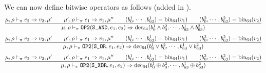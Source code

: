 We can now define bitwise operators as follows (added in \Cpm).\\
\[\dfrac{\mu,\rho\vdash_\pi e_2\Rightarrow v_2,\mu' \qquad \mu',\rho\vdash_\pi e_1\Rightarrow v_1,\mu'' \qquad (b_0^1,\cdots,b_{63}^1) = \operatorname{bin_{64}}(v_1) \qquad (b_0^2,\cdots,b_{63}^2) = \operatorname{bin_{64}}(v_2)}{\mu,\rho\vdash_\pi \texttt{OP2}(\texttt{S\_AND}, e_1, e_2) \Rightarrow \operatorname{dec_{64}}(b_0^1 \wedge b_0^2,\cdots, b_{63}^1 \wedge b_{63}^2)}\]
\[\dfrac{\mu,\rho\vdash_\pi e_2\Rightarrow v_2,\mu' \qquad \mu',\rho\vdash_\pi e_1\Rightarrow v_1,\mu'' \qquad (b_0^1,\cdots,b_{63}^1) = \operatorname{bin_{64}}(v_1) \qquad (b_0^2,\cdots,b_{63}^2) = \operatorname{bin_{64}}(v_2)}{\mu,\rho\vdash_\pi \texttt{OP2}(\texttt{S\_OR}, e_1, e_2) \Rightarrow \operatorname{dec_{64}}(b_0^1 \vee b_0^2,\cdots, b_{63}^1 \vee b_{63}^2)}\]
\[\dfrac{\mu,\rho\vdash_\pi e_2\Rightarrow v_2,\mu' \qquad \mu',\rho\vdash_\pi e_1\Rightarrow v_1,\mu'' \qquad (b_0^1,\cdots,b_{63}^1) = \operatorname{bin_{64}}(v_1) \qquad (b_0^2,\cdots,b_{63}^2) = \operatorname{bin_{64}}(v_2)}{\mu,\rho\vdash_\pi \texttt{OP2}(\texttt{S\_XOR}, e_1, e_2) \Rightarrow \operatorname{dec_{64}}(b_0^1 \oplus b_0^2,\cdots, b_{63}^1 \oplus b_{63}^2)}\]



